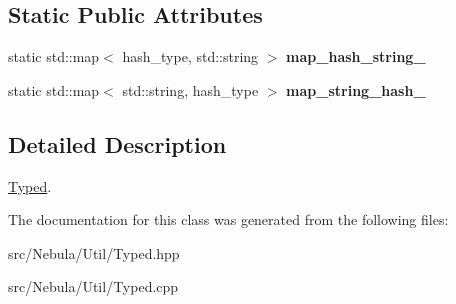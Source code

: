 \subsection*{\-Static \-Public \-Attributes}
\begin{DoxyCompactItemize}
\item 
\hypertarget{classNeb_1_1Typed_a0e2dd45af0f2d3b85f2285795bb370b3}{static std\-::map$<$ hash\-\_\-type, \*
std\-::string $>$ {\bfseries map\-\_\-hash\-\_\-string\-\_\-}}\label{classNeb_1_1Typed_a0e2dd45af0f2d3b85f2285795bb370b3}

\item 
\hypertarget{classNeb_1_1Typed_a06b5054c1ccff608d9f412dd0bcb24dd}{static std\-::map$<$ std\-::string, \*
hash\-\_\-type $>$ {\bfseries map\-\_\-string\-\_\-hash\-\_\-}}\label{classNeb_1_1Typed_a06b5054c1ccff608d9f412dd0bcb24dd}

\end{DoxyCompactItemize}


\subsection{\-Detailed \-Description}
\hyperlink{classNeb_1_1Typed}{\-Typed}. 

\-The documentation for this class was generated from the following files\-:\begin{DoxyCompactItemize}
\item 
src/\-Nebula/\-Util/\-Typed.\-hpp\item 
src/\-Nebula/\-Util/\-Typed.\-cpp\end{DoxyCompactItemize}
